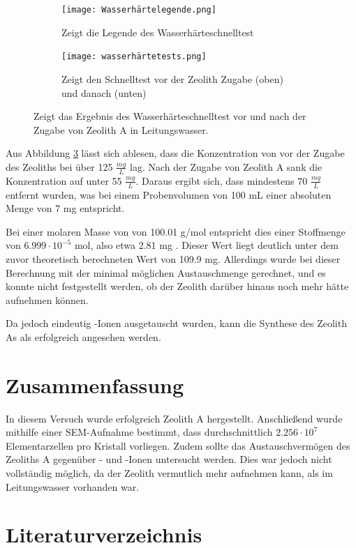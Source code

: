 \documentclass[12pt, a4paper]{article}
\begin{document}
\begin{figure}[ht]
    \centering
  \begin{subfigure}[b]{0.47\linewidth}
    \centering
    \texttt{[image: Wasserhärtelegende.png]}
    \caption{Zeigt die Legende des Wasserhärteschnelltest}
    \label{ganz}
    
  \end{subfigure}
   \begin{subfigure}[b]{0.47\linewidth}
    \centering
    \texttt{[image: wasserhärtetests.png]}
    \caption{Zeigt den Schnelltest vor der Zeolith Zugabe (oben) und danach (unten)}
    \label{zoom}
    
  \end{subfigure}
  \caption{Zeigt das Ergebnis des Wasserhärteschnelltest vor und nach der Zugabe von Zeolith A in Leitungswasser.}
  \label{Physisorption}
\end{figure}

\noindent
Aus Abbildung \ref{Physisorption} lässt sich ablesen, dass die Konzentration von  vor der Zugabe des Zeoliths bei über 125 $\frac{mg}{L}$ lag. Nach der Zugabe von Zeolith A sank die Konzentration auf unter 55 $\frac{mg}{L}$. Daraus ergibt sich, dass mindestens 70 $\frac{mg}{L}$  entfernt wurden, was bei einem Probenvolumen von 100 mL einer absoluten Menge von 7 mg entspricht.

\noindent
Bei einer molaren Masse von  von 100.01 g/mol entspricht dies einer Stoffmenge von \(6.999 \cdot 10^{-5}\) mol, also etwa 2.81 mg . Dieser Wert liegt deutlich unter dem zuvor theoretisch berechneten Wert von 109.9 mg. Allerdings wurde bei dieser Berechnung mit der minimal möglichen Austauschmenge gerechnet, und es konnte nicht festgestellt werden, ob der Zeolith darüber hinaus noch mehr  hätte aufnehmen können.

\noindent
Da jedoch eindeutig -Ionen ausgetauscht wurden, kann die Synthese des Zeolith As als erfolgreich angesehen werden.



\newpage
\section{Zusammenfassung}
In diesem Versuch wurde erfolgreich Zeolith A hergestellt. Anschließend wurde mithilfe einer SEM-Aufnahme bestimmt, dass durchschnittlich \(2.256 \cdot 10^7\) Elementarzellen pro Kristall vorliegen. Zudem sollte das Austauschvermögen des Zeoliths A gegenüber - und -Ionen untersucht werden. Dies war jedoch nicht vollständig möglich, da der Zeolith vermutlich mehr  aufnehmen kann, als im Leitungswasser vorhanden war.


\newpage
\section{Literaturverzeichnis}
\printbibliography
\end{document}
